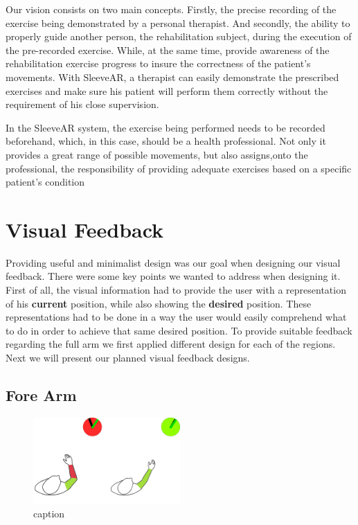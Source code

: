 Our vision consists on two main concepts. Firstly, the precise recording of the exercise being demonstrated by a personal therapist. 
And secondly, the ability to properly guide another person, the rehabilitation subject, during the execution of the pre-recorded exercise. 
While, at the same time, provide awareness of the rehabilitation exercise progress to insure the correctness of the patient's movements.
With SleeveAR, a therapist can easily demonstrate the prescribed exercises and make sure his patient will perform them correctly without the requirement of his close supervision.

In the SleeveAR system, the exercise being performed needs to be recorded beforehand, which, in this case, should be a health professional. 
Not only it provides a great range of possible movements, but also assigns,onto the professional, the responsibility of providing adequate exercises based on a specific patient's condition


\section{Visual Feedback}

Providing useful and minimalist design was our goal when designing our visual feedback. There were some key points we wanted to address when designing it.
First of all, the visual information had to provide the user with a representation of his \textbf{current} position, while also showing the \textbf{desired} position. 
These representations had to be done in a way the user would easily comprehend what to do in order to achieve that same desired position.
To provide suitable feedback regarding the full arm we first applied different design for each of the regions. Next we will present our planned visual feedback designs.

\subsection{Fore Arm}

\begin{figure}[!t]
    \begin{center}
        \includegraphics[width=0.5\textwidth]{imgs/forearmfeedback.png}
    \end{center}
    \caption{caption}
    \label{fig:forearmfeedback}
\end{figure}

